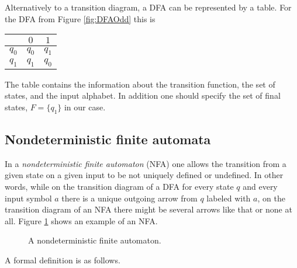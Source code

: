 \begin{page}
\setcounter{section}{1}
\setcounter{subsection}{2}
\setcounter{dfn}{5}
\label{portion:909}

\begin{rem}
Alternatively to a transition diagram, a DFA can be represented by a table.
For the DFA from Figure \ref{fig:DFAOdd} this is
\begin{center}
\begin{tabular}{c|cc}
& $0$ & $1$\\
\hline
$q_0$ & $q_0$ & $q_1$\\
$q_1$ & $q_1$ & $q_0$
\end{tabular}
\end{center}
The table contains the information about the transition function, the set of states, and the input alphabet.
In addition one should specify the set of final states, $F = \{q_1\}$ in our case.
\end{rem}

\end{page}

\begin{page}
\setcounter{section}{1}
\setcounter{subsection}{3}
\setcounter{dfn}{5}
\label{portion:911}

\subsection{Nondeterministic finite automata}
In a \emph{nondeterministic finite automaton} (NFA) one allows the transition from a given state on a given input to be not uniquely defined or undefined.
In other words, while on the transition diagram of a DFA for every state $q$ and every input symbol $a$ there is a unique outgoing arrow from $q$ labeled with $a$,
on the transition diagram of an NFA there might be several arrows like that or none at all.
Figure \ref{fig:NFA} shows an example of an NFA.

\begin{figure}[htb]
\begin{center}

\end{center}
\caption{A nondeterministic finite automaton.}
\label{fig:NFA}
\end{figure}

A formal definition is as follows.

\end{page}


